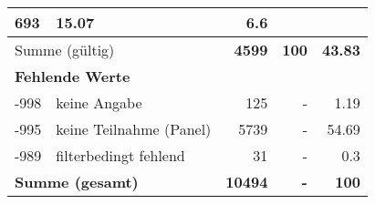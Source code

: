 \begin{longtable}{lXrrr}
       \num{693} &
       \num[round-mode=places,round-precision=2]{15.07} &
         \num[round-mode=places,round-precision=2]{6.6} \\
     \midrule
     \multicolumn{2}{l}{Summe (gültig)} &
       \textbf{\num{4599}} &
     \textbf{\num{100}} &
       \textbf{\num[round-mode=places,round-precision=2]{43.83}} \\
     \multicolumn{5}{l}{\textbf{Fehlende Werte}}\\
       -998 &
       keine Angabe &
         \num{125} &
        - &
         \num[round-mode=places,round-precision=2]{1.19} \\
       -995 &
       keine Teilnahme (Panel) &
         \num{5739} &
        - &
         \num[round-mode=places,round-precision=2]{54.69} \\
       -989 &
       filterbedingt fehlend &
         \num{31} &
        - &
         \num[round-mode=places,round-precision=2]{0.3} \\
     \midrule
     \multicolumn{2}{l}{\textbf{Summe (gesamt)}} &
          \textbf{\num{10494}} &
        \textbf{-} &
        \textbf{\num{100}} \\
     \bottomrule
     \end{longtable}
     
